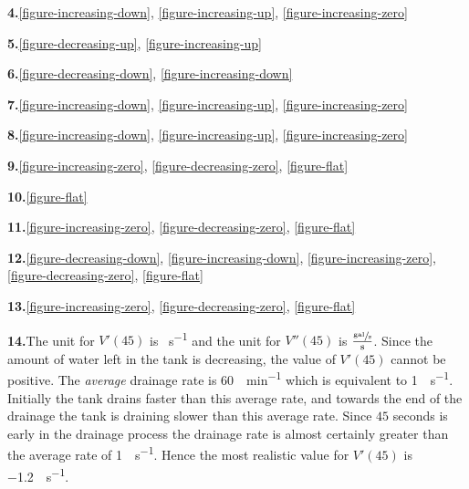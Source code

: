\documentclass[10pt,oneside,]{book}
\theoremstyle{plain}
\theoremstyle{definition}
\numberwithin{equation}{section}
\newcommand{\fe}[2]{#1\mathopen{}\left(#2\right)\mathclose{}}
\newcommand{\fd}[1]{#1'}
\newcommand{\sd}[1]{#1''}
\begin{document}
\par\smallskip
\noindent\textbf{4.}\quad{}\hyperref[figure-increasing-down]{\ref{figure-increasing-down}}, \hyperref[figure-increasing-up]{\ref{figure-increasing-up}}, \hyperref[figure-increasing-zero]{\ref{figure-increasing-zero}}%
\par\smallskip
\noindent\textbf{5.}\quad{}\hyperref[figure-decreasing-up]{\ref{figure-decreasing-up}}, \hyperref[figure-increasing-up]{\ref{figure-increasing-up}}%
\par\smallskip
\noindent\textbf{6.}\quad{}\hyperref[figure-decreasing-down]{\ref{figure-decreasing-down}}, \hyperref[figure-increasing-down]{\ref{figure-increasing-down}}%
\par\smallskip
\noindent\textbf{7.}\quad{}\hyperref[figure-increasing-down]{\ref{figure-increasing-down}}, \hyperref[figure-increasing-up]{\ref{figure-increasing-up}}, \hyperref[figure-increasing-zero]{\ref{figure-increasing-zero}}%
\par\smallskip
\noindent\textbf{8.}\quad{}\hyperref[figure-increasing-down]{\ref{figure-increasing-down}}, \hyperref[figure-increasing-up]{\ref{figure-increasing-up}}, \hyperref[figure-increasing-zero]{\ref{figure-increasing-zero}}%
\par\smallskip
\noindent\textbf{9.}\quad{}\hyperref[figure-increasing-zero]{\ref{figure-increasing-zero}}, \hyperref[figure-decreasing-zero]{\ref{figure-decreasing-zero}}, \hyperref[figure-flat]{\ref{figure-flat}}%
\par\smallskip
\noindent\textbf{10.}\quad{}\hyperref[figure-flat]{\ref{figure-flat}}%
\par\smallskip
\noindent\textbf{11.}\quad{}\hyperref[figure-increasing-zero]{\ref{figure-increasing-zero}}, \hyperref[figure-decreasing-zero]{\ref{figure-decreasing-zero}}, \hyperref[figure-flat]{\ref{figure-flat}}%
\par\smallskip
\noindent\textbf{12.}\quad{}\hyperref[figure-decreasing-down]{\ref{figure-decreasing-down}}, \hyperref[figure-increasing-down]{\ref{figure-increasing-down}}, \hyperref[figure-increasing-zero]{\ref{figure-increasing-zero}}, \hyperref[figure-decreasing-zero]{\ref{figure-decreasing-zero}}, \hyperref[figure-flat]{\ref{figure-flat}}%
\par\smallskip
\noindent\textbf{13.}\quad{}\hyperref[figure-increasing-zero]{\ref{figure-increasing-zero}}, \hyperref[figure-decreasing-zero]{\ref{figure-decreasing-zero}}, \hyperref[figure-flat]{\ref{figure-flat}}%
\par\smallskip
\noindent\textbf{14.}\quad{}The unit for \(\fe{\fd{V}}{45}\) is \si{\gallon\per\second} and the unit for \(\fe{\sd{V}}{45}\) is \(\frac{\sfrac{\text{gal}}{\text{s}}}{\text{s}}\). Since the amount of water left in the tank is decreasing, the value of \(\fe{\fd{V}}{45}\) cannot be positive. The \emph{average} drainage rate is \SI{60}{\gallon\per\minute} which is equivalent to \SI{1}{\gallon\per\second}. Initially the tank drains faster than this average rate, and towards the end of the drainage the tank is draining slower than this average rate.  Since \(45\) seconds is early in the drainage process the drainage rate is almost certainly greater than the average rate of \SI{1}{\gallon\per\second}.  Hence the most realistic value for \(\fe{\fd{V}}{45}\) is \SI{-1.2}{\gallon\per\second}.%
\end{document}
